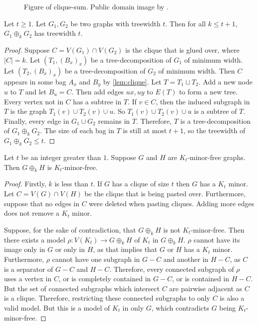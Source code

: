 \begin{figure}[h]
	\centering
	
	\caption[Clique-sum]{Figure of clique-sum. Public domain image by \textcite{eppsteinCliquesum2023}.}\label{fig:clique-sum}
\end{figure}


\begin{proposition}\label{prop:cliquesum_treewidth}
	Let $t \geq 1$. Let $G_1, G_2$ be two graphs with treewidth $t$. Then for all $k \leq t + 1$, $G_1 \oplus_k G_2$ has treewidth $t$. 
\end{proposition}
\begin{proof}
	Suppose $C = V(G_1) \cap V(G_2)$ is the clique that is glued over, where $|C| = k$. Let $(T_1, (B_x)_x)$ be a tree-decomposition of $G_1$ of minimum width. Let $(T_2, (B_x)_x)$ be a tree-decomposition of $G_2$ of minimum width. Then $C$ appears in some bag $A_x$ and $B_y$ by \cref{lem:clique}. Let $T = T_1 \sqcup T_2$. Add a new node $u$ to $T$ and let $B_u = C$. Then add edges $ux, uy$ to $E(T)$ to form a new tree. Every vertex not in $C$ has a subtree in $T$. If $v \in C$, then the induced subgraph in $T$ is the graph $T_1(v) \cup T_2(v) \cup u$. So $T_1(v) \cup T_2(v) \cup u$ is a subtree of $T$. Finally, every edge in $G_1 \cup G_2$ remains in $T$. Therefore, $T$ is a tree-decomposition of $G_1 \oplus_k G_2$. The size of each bag in $T$ is still at most $t + 1$, so the treewidth of $G_1 \oplus_k G_2 \leq t$.
\end{proof}

\begin{proposition}\label{prop:cliquesum_minor}
	Let $t$ be an integer greater than $1$. Suppose $G$ and $H$ are $K_t$-minor-free graphs. Then $G \oplus_k H$ is $K_{t}$-minor-free. 
\end{proposition}
\begin{proof}
	Firstly, $k$ is less than $t$. If $G$ has a clique of size $t$ then $G$ has a $K_t$ minor. Let $C = V(G) \cap V(H)$ be the clique that is being pasted over. Furthermore, suppose that no edges in $C$ were deleted when pasting cliques. Adding more edges does not remove a $K_t$ minor. 

	Suppose, for the sake of contradiction, that $G \oplus_k H$ is not $K_t$-minor-free. Then there exists a model $\rho: V(K_t) \rightarrow G\oplus_k H$ of $K_t$ in $G \oplus_k H$. $\rho$ cannot have its image only in $G$ or only in $H$, as that implies that $G$ or $H$ has a $K_t$ minor. Furthermore, $\rho$ cannot have one subgraph in $G - C$ and another in $H - C$, as $C$ is a separator of $G - C$ and $H - C$.
	Therefore, every connected subgraph of $\rho$ uses a vertex in $C$, or is completely contained in $G - C$, or is contained in $H - C$. But the set of connected subgraphs which intersect $C$ are pairwise adjacent as $C$ is a clique. Therefore, restricting these connected subgraphs to only $C$ is also a valid model. But this is a model of $K_t$ in only $G$, which contradicts $G$ being $K_t$-minor-free. 
\end{proof}

